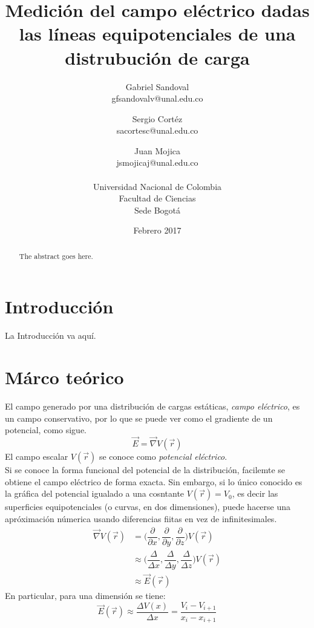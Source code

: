 \documentclass[10pt,twocolumn]{article}
\title{Medición del campo el\'ectrico dadas las l\'ineas equipotenciales de una distrubuci\'on de carga}
\author{Gabriel Sandoval \\ gfsandovalv@unal.edu.co \and Sergio Cortéz \\sacortesc@unal.edu.co \and Juan Mojica \\jsmojicaj@unal.edu.co\\ \\Universidad Nacional de Colombia\\Facultad de Ciencias \\ Sede Bogotá}
\date{Febrero 2017}
\begin{document}
\maketitle{}
\begin{abstract}
The abstract goes here.
\end{abstract}

\section{Introducción}
La Introducción va aquí.
\section{Márco teórico}
El campo generado por una distribución de cargas estáticas, \emph{campo eléctrico}, es un campo conservativo, por lo que se puede ver como el gradiente de un potencial, como sigue. \cite{griffiths}
\begin{equation}\label{gradiente}
  \vec{E}=\vec{\nabla}V(\vec{r})
\end{equation}
El campo escalar $V(\vec{r})$ se conoce como \emph{potencial eléctrico}.\\
Si se conoce la forma funcional del potencial de la distribución, facilemte se obtiene el campo eléctrico de forma exacta. Sin embargo, si lo único conocido es la gráfica del potencial igualado a una cosntante $V(\vec{r})=V_0$, es decir las superficies equipotenciales (o curvas, en dos dimensiones), puede hacerse una apróximación númerica usando diferencias fiitas en vez de infinitesimales.
\begin{equation*}
  \begin{split}
    \vec{\nabla}V(\vec{r})&=\Big(\dfrac{\partial}{\partial x}, \dfrac{\partial}{\partial y},
    \dfrac{\partial}{\partial z}\Big) V(\vec{r})\\
    &\approx \Big(\dfrac{\Delta}{\Delta x}, \dfrac{\Delta}{\Delta y}, \dfrac{\Delta}{\Delta z}\Big) V(\vec{r})\\
    &\approx \vec{E}(\vec{r})
  \end{split}
\end{equation*}
En particular, para una dimensión se tiene:
\begin{equation}\label{1dimension}
\vec{E}(\vec{r}) \approx \dfrac{\Delta V(x)}{\Delta x}=\dfrac{V_i-V_{i+1}}{x_i-x_{i+1}}  
\end{equation}
\end{document}
